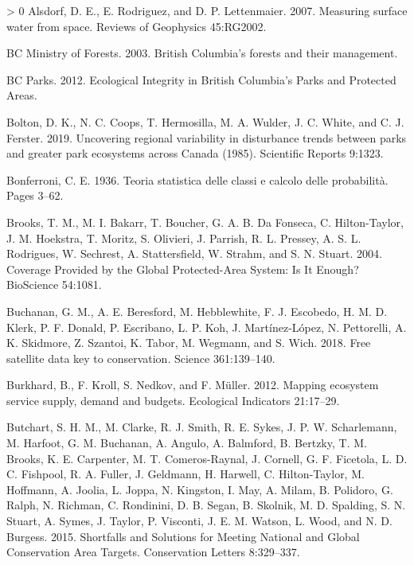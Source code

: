 \documentclass[10pt,oneside]{article}
\newlength{\cslhangindent}
\newenvironment{CSLReferences}[3] %
 {%
  \setlength{\parindent}{0pt}
  \ifodd #1 \everypar{\setlength{\hangindent}{\cslhangindent}}\ignorespaces\fi
  \ifnum #2 > 0
  \setlength{\parskip}{#2\baselineskip}
  \fi
 }%
 {}
\begin{document}
\hypertarget{refs}{}
\begin{CSLReferences}{1}{0}
\leavevmode\hypertarget{ref-alsdorf2007}{}%
Alsdorf, D. E., E. Rodriguez, and D. P. Lettenmaier. 2007. Measuring
surface water from space. Reviews of Geophysics 45:RG2002.

\leavevmode\hypertarget{ref-bcministryofforestsBritishColumbiaForests2003}{}%
BC Ministry of Forests. 2003. British Columbia's forests and their
management.

\leavevmode\hypertarget{ref-bcparks2012}{}%
BC Parks. 2012. Ecological Integrity in British Columbia's Parks and
Protected Areas.

\leavevmode\hypertarget{ref-boltonUncoveringRegionalVariability2019}{}%
Bolton, D. K., N. C. Coops, T. Hermosilla, M. A. Wulder, J. C. White,
and C. J. Ferster. 2019. Uncovering regional variability in disturbance
trends between parks and greater park ecosystems across Canada (1985).
Scientific Reports 9:1323.

\leavevmode\hypertarget{ref-bonferroni1936}{}%
Bonferroni, C. E. 1936. Teoria statistica delle classi e calcolo delle
probabilità. Pages 3--62.

\leavevmode\hypertarget{ref-brooks2004}{}%
Brooks, T. M., M. I. Bakarr, T. Boucher, G. A. B. Da Fonseca, C.
Hilton-Taylor, J. M. Hoekstra, T. Moritz, S. Olivieri, J. Parrish, R. L.
Pressey, A. S. L. Rodrigues, W. Sechrest, A. Stattersfield, W. Strahm,
and S. N. Stuart. 2004. Coverage Provided by the Global Protected-Area
System: Is It Enough? BioScience 54:1081.

\leavevmode\hypertarget{ref-buchanan2018}{}%
Buchanan, G. M., A. E. Beresford, M. Hebblewhite, F. J. Escobedo, H. M.
D. Klerk, P. F. Donald, P. Escribano, L. P. Koh, J. Martínez-López, N.
Pettorelli, A. K. Skidmore, Z. Szantoi, K. Tabor, M. Wegmann, and S.
Wich. 2018. Free satellite data key to conservation. Science
361:139--140.

\leavevmode\hypertarget{ref-burkhardMappingEcosystemService2012}{}%
Burkhard, B., F. Kroll, S. Nedkov, and F. Müller. 2012. Mapping
ecosystem service supply, demand and budgets. Ecological Indicators
21:17--29.

\leavevmode\hypertarget{ref-butchart2015}{}%
Butchart, S. H. M., M. Clarke, R. J. Smith, R. E. Sykes, J. P. W.
Scharlemann, M. Harfoot, G. M. Buchanan, A. Angulo, A. Balmford, B.
Bertzky, T. M. Brooks, K. E. Carpenter, M. T. Comeros-Raynal, J.
Cornell, G. F. Ficetola, L. D. C. Fishpool, R. A. Fuller, J. Geldmann,
H. Harwell, C. Hilton-Taylor, M. Hoffmann, A. Joolia, L. Joppa, N.
Kingston, I. May, A. Milam, B. Polidoro, G. Ralph, N. Richman, C.
Rondinini, D. B. Segan, B. Skolnik, M. D. Spalding, S. N. Stuart, A.
Symes, J. Taylor, P. Visconti, J. E. M. Watson, L. Wood, and N. D.
Burgess. 2015. Shortfalls and Solutions for Meeting National and Global
Conservation Area Targets. Conservation Letters 8:329--337.


\end{CSLReferences}
\end{document}
